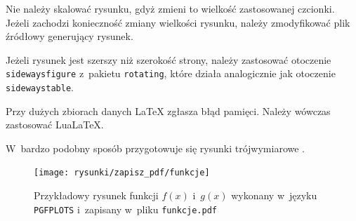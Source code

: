 Nie należy skalować rysunku, gdyż zmieni to wielkość zastosowanej czcionki. Jeżeli zachodzi konieczność zmiany wielkości rysunku, należy zmodyfikować plik źródłowy generujący rysunek.

Jeżeli rysunek jest szerszy niż szerokość strony, należy zastosować otoczenie \verb+sidewaysfigure+ z~pakietu \verb+rotating+, które działa analogicznie jak otoczenie \verb+sidewaystable+.

Przy dużych zbiorach danych \LaTeX{} zgłasza błąd pamięci. Należy wówczas zastosować \hbox{Lua\LaTeX}.

W~bardzo podobny sposób przygotowuje się rysunki trójwymiarowe \cite{litFeuersanger2016}.

\begin{figure}[ptb]
\centering
\texttt{[image: rysunki/zapisz\_pdf/funkcje]}
\caption{Przykładowy rysunek funkcji $f(x)$ i~$g(x)$ wykonany
w~języku \texttt{PGFPLOTS} i~zapisany w~pliku \texttt{funkcje.pdf}}
\label{r_pgfplots_funkcje_pdf}
\end{figure}

